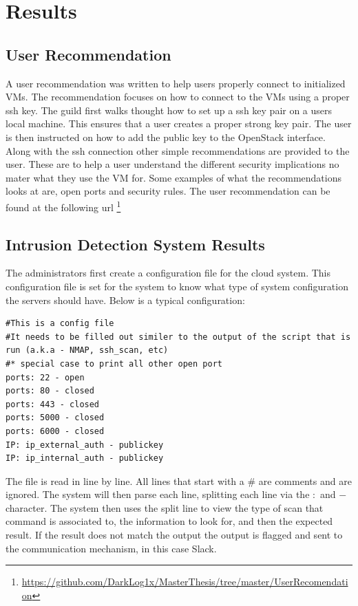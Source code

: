 \documentclass[12pt]{article}
\begin{document}
\section{Results}

\subsection{User Recommendation}
A user recommendation was written to help users properly connect to initialized VMs. The recommendation focuses on how to connect to the VMs using a proper ssh key. The guild first walks thought how to set up a ssh key pair on a users local machine. This ensures that a user creates a proper strong key pair. The user is then instructed on how to add the public key to the OpenStack interface. Along with the ssh connection other simple recommendations are provided to the user. These are to help a user understand the different security implications no mater what they use the VM for. Some examples of what the recommendations looks at are, open ports and security rules. The user recommendation can be found at the following url \footnote{\href{https://github.com/DarkLog1x/MasterThesis/tree/master/UserRecomendation}{https://github.com/DarkLog1x/MasterThesis/tree/master/UserRecomendation}}

\subsection{Intrusion Detection System Results}
The administrators first create a configuration file for the cloud system. This configuration file is set for the system to know what type of system configuration the servers should have. Below is a typical configuration:

\begin{mdframed}
    \begin{lstlisting}
#This is a config file
#It needs to be filled out similer to the output of the script that is run (a.k.a - NMAP, ssh_scan, etc)
#* special case to print all other open port 
ports: 22 - open
ports: 80 - closed
ports: 443 - closed
ports: 5000 - closed
ports: 6000 - closed
IP: ip_external_auth - publickey
IP: ip_internal_auth - publickey
    \end{lstlisting}
\end{mdframed}
The file is read in line by line. All lines that start with a \# are comments and are ignored. The system will then parse each line, splitting each line via the $:$ and $-$ character. The system then uses the split line to view the type of scan that command is associated to, the information to look for, and then the expected result. If the result does not match the output the output is flagged and sent to the communication mechanism, in this case Slack.
\end{document}
